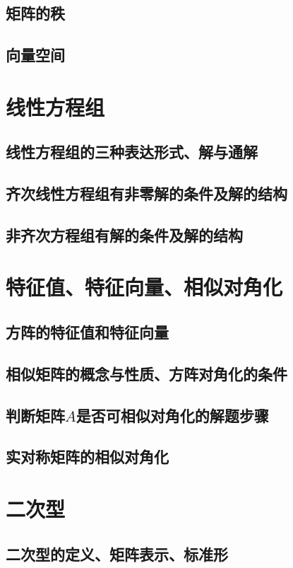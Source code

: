 \documentclass[lang=cn,10pt]{elegantbook}
\begin{document}
\section{矩阵的秩}
\section{向量空间}

\chapter{线性方程组}
\section{线性方程组的三种表达形式、解与通解}
\section{齐次线性方程组有非零解的条件及解的结构}
\section{非齐次方程组有解的条件及解的结构}


\chapter{特征值、特征向量、相似对角化}
\section{方阵的特征值和特征向量}
\section{相似矩阵的概念与性质、方阵对角化的条件}
\section{判断矩阵$A$是否可相似对角化的解题步骤}
\section{实对称矩阵的相似对角化}

\chapter{二次型}
\section{二次型的定义、矩阵表示、标准形}
\end{document}
